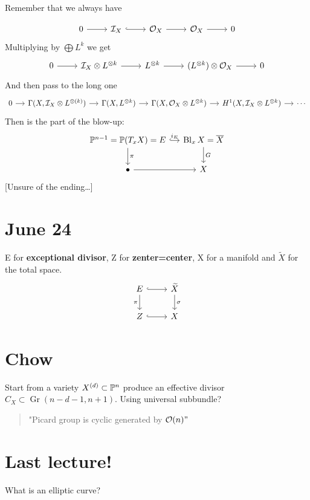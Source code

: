 Remember that we always have

\[\begin{tikzcd}
	0\arrow[r]&\mathcal{I}_X\arrow[r,hook]&\mathcal{O}_X\arrow[r]&\mathcal{O}_X\arrow[r]&0
\end{tikzcd}\]
Multiplying by $\bigoplus L^k$ we get
\[\begin{tikzcd}
	0\arrow[r]&\mathcal{I}_X\otimes L^{\otimes k}\arrow[r]&L^{\otimes k}\arrow[r]&(L^{\otimes k})\otimes \mathcal{O}_X\arrow[r]&0
\end{tikzcd}\]
And then pass to the long one
\[\begin{tikzcd}[column sep=small]
	0\arrow[r]&\Gamma(X,\mathcal{I}_X\otimes L^{\otimes (k)})\arrow[r]&\Gamma(X,L^{\otimes k})\arrow[r]&\Gamma(X,\mathcal{O}_X\otimes L^{\otimes k})\arrow[r]&H^{1}(X,\mathcal{I}_X\otimes L^{\otimes k})\arrow[r]&\cdots
\end{tikzcd}\]
Then is the part of the blow-up:
\[\begin{tikzcd}[column sep=small]
	\P^{n-1}=\P(T_xX)=E\arrow[r,hook,"i_E"]\arrow[d,"\pi"]&\operatorname{Bl}_xX=\overline{X}\arrow[d,"G"]\\
	\bullet\arrow[r]&X
\end{tikzcd}\]
{\color{blue}[Unsure of the ending…]}

\section{June 24}\label{sec:June 24}
E for \textbf{exceptional divisor}, Z for \textbf{zenter=center}, X for a manifold and $\widetilde{X}$ for the total space.
\[\begin{tikzcd}
	E\arrow[r,hook]\arrow[d,"\pi",swap]&\widetilde{X}\arrow[d,"\sigma"]\\
	Z\arrow[r,hook]& X
\end{tikzcd}\]

\section{Chow}\label{sec:Chow}
Start from a variety $X^{(d)}\subset \P^{n}$ produce an effective divisor  $C_{X}\subset \operatorname{Gr}(n-d-1,n+1) $. {\color{blue}Using universal subbundle?}

\begin{quotation}
	"Picard group is cyclic generated by $\mathcal{O}(n)"$
\end{quotation}

\section{Last lecture!}\label{sec:Last lecture!}
What is an elliptic curve?


